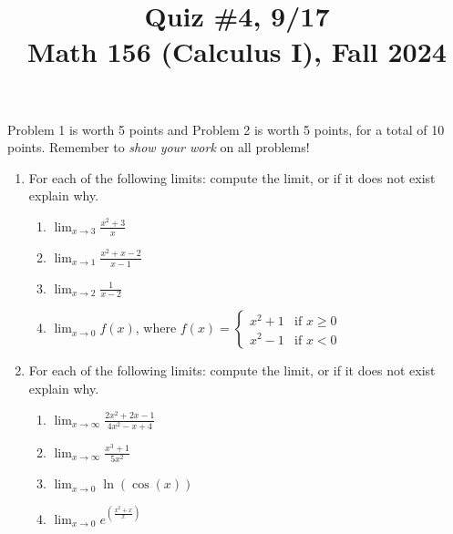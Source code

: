 \documentclass[11pt]{article}
\title{Quiz \#4, 9/17 \\ Math 156 (Calculus I), Fall 2024}
\date{}
\begin{document}
\maketitle

\thispagestyle{empty}

\vspace{-2cm}

Problem 1 is worth 5 points and Problem 2 is worth 5 points, for a total of 10 points. Remember to \emph{show your work} on all problems!

\begin{enumerate}
\item For each of the following limits: compute the limit, or if it does not exist explain why.
\begin{enumerate}
\item $\displaystyle \lim_{x \to 3} \frac{x^2+3}{x}$
\item $\displaystyle \lim_{x \to 1} \frac{x^2+x-2}{x-1}$
\item $\displaystyle \lim_{x \to 2} \frac{1}{x-2}$
\item $\displaystyle \lim_{x \to 0} f(x)$, where $f(x) = \begin{cases} x^2+1 &\textrm{if $x \geq 0$} \\ x^2-1 &\textrm{if $x < 0$} \end{cases}$
\end{enumerate}

\vspace{2.15in}

\item For each of the following limits: compute the limit, or if it does not exist explain why.
\begin{enumerate}
\item $\displaystyle \lim_{x \to \infty} \frac{2x^2+2x-1}{4x^2-x+4}$
\item $\displaystyle \lim_{x \to \infty} \frac{x^3+1}{5x^2}$
\item $\displaystyle \lim_{x \to 0} \ln(\cos(x))$
\item $\displaystyle \lim_{x \to 0} e^{(\frac{x^2+x}{x})}$
\end{enumerate}

\end{enumerate}
\end{document}
